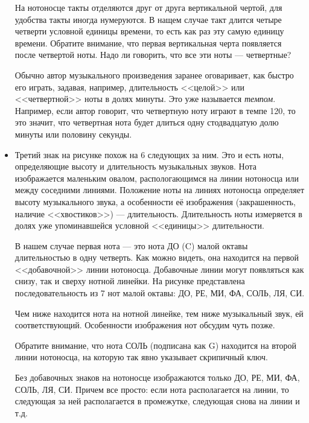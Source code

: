 \begin{itemize}
    На нотоносце такты отделяются друг от друга вертикальной чертой, для удобства такты иногда нумеруются. В нащем случае такт длится четыре четверти условной единицы времени, то есть как раз эту самую единицу времени. Обратите внимание, что первая вертикальная черта появляется после четвертой ноты. Надо ли говорить, что все эти ноты --- четвертные?
    
    Обычно автор музыкального произведения заранее оговаривает, как быстро его играть, задавая, например, длительность <<целой>> или <<четвертной>> ноты в долях минуты. Это уже называется \emph{темпом}. Например, если автор говорит, что четвертную ноту играют в темпе 120, то это значит, что четвертная нота будет длиться одну стодвадцатую долю минуты или половину секунды.
    
    \item Третий знак на рисунке похож на 6 следующих за ним. Это и есть ноты, определяющие высоту и длительность музыкальных звуков. Нота изображается маленьким овалом, распологающимся на линии нотоносца или между соседними линиями. Положение ноты на линиях нотоносца определяет высоту музыкального звука, а особенности её изображения (закрашенность, наличие <<хвостиков>>) --- длительность. Длительность ноты измеряется в долях уже упоминавшейся условной <<единицы>> длительности.
    
    В нашем случае первая нота --- это нота ДО (C) малой октавы длительностью в одну четверть. Как можно видеть, она находится на первой <<добавочной>> линии нотоносца. Добавочные линии могут появляться как снизу, так и сверху нотной линейки. На рисунке представлена последовательность из 7 нот малой октавы: ДО, РЕ, МИ, ФА, СОЛЬ, ЛЯ, СИ.
    
    Чем ниже находится нота на нотной линейке, тем ниже музыкальный звук, ей соответствующий. Особенности изображения нот обсудим чуть позже.
        
    Обратите внимание, что нота СОЛЬ (подписана как G) находится на второй линии нотоносца, на которую так явно указывает скрипичный ключ.
    
    Без добавочных знаков на нотоносце изображаются только ДО, РЕ, МИ, ФА, СОЛЬ, ЛЯ, СИ. Причем все просто: если нота располагается на линии, то следующая за ней располагается в промежутке, следующая снова на линии и т.д.
\end{itemize}

